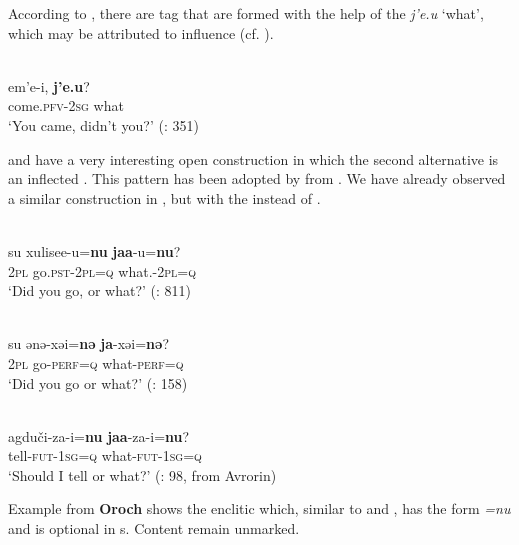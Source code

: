 According to \citet[351]{NikolaevaTolskaya2001}, there are tag  that are formed with the help of the  \textit{j’e.u} ‘what’, which may be attributed to  influence (cf. ).

\ea%
    \label{ex:tungu:41}
    \\
    \gll em’e-i, \textbf{{j’e.u}}?\\
    come.\textsc{pfv}-2\textsc{sg}  what\\
    \glt ‘You came, didn’t you?’ (\citealt{NikolaevaTolskaya2001}: 351)
    \z

 and  have a very interesting open  construction in which the second alternative is an inflected . This pattern has been adopted by  from . We have already observed a similar construction in  , but with the   instead of .

\ea%
    \label{ex:tungu:42}
    \\
    \gll su  xulisee-u=\textbf{{nu}} \textbf{{jaa}}{-u=}\textbf{{nu}}?\\
    2\textsc{pl}  go.\textsc{pst}-2\textsc{pl}=\textsc{q}    what.\textsc-2\textsc{pl}=\textsc{q}\\
    \glt ‘Did you go, or what?’ (\citealt{NikolaevaTolskaya2001}: 811)
    \z

\ea%
    \label{ex:tungu:43}
   \\
    \gll su  ənə-xəi=\textbf{{nə}} \textbf{{ja}}{-xəi=}\textbf{{nə}}?\\
    2\textsc{pl}  go-\textsc{perf}=\textsc{q}    what-\textsc{perf}=\textsc{q}\\
    \glt ‘Did you go or what?’ (\citealt{ZhangPaiyu2013}: 158)
    \z

\ea%
    \label{ex:tungu:44}
    \\
    \gll agduči-za-i=\textbf{{nu}} \textbf{{jaa}}{-za-i=}\textbf{{nu}}?\\
    tell-\textsc{fut}-1\textsc{sg}=\textsc{q}    what-\textsc{fut}-1\textsc{sg}=\textsc{q}\\
    \glt ‘Should I tell or what?’ (\citealt{TolskayaTolskaya2008}: 98, from Avrorin)
    \z

Example  from \textbf{Oroch} shows the  enclitic which, similar to  and , has the form \textit{=nu} and is optional in s. Content  remain unmarked.

